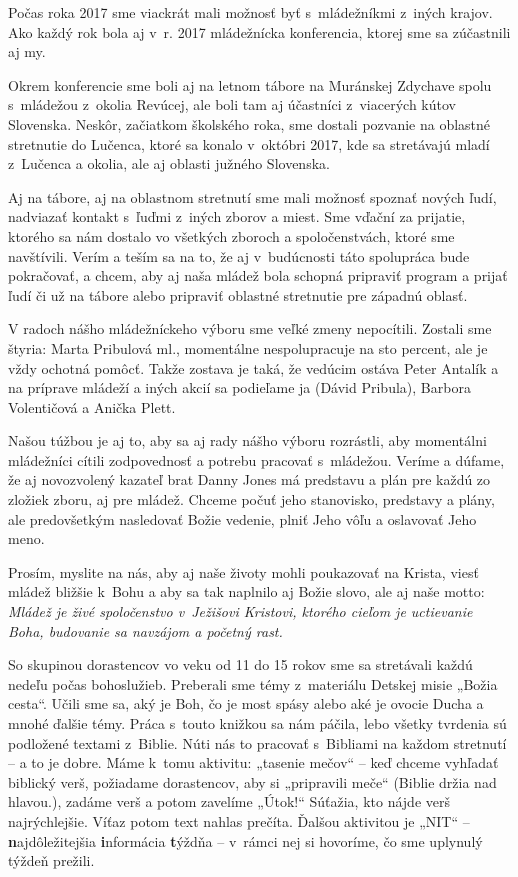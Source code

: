 Počas roka 2017 sme viackrát mali možnosť byť s~mládežníkmi z~iných krajov. Ako každý rok bola aj v~r. 2017 mládežnícka konferencia, ktorej sme sa zúčastnili aj my.

Okrem konferencie sme boli aj na letnom tábore na Muránskej Zdychave spolu s~mládežou z~okolia Revúcej, ale boli tam aj účastníci z~viacerých kútov Slovenska.
Neskôr, začiatkom školského roka, sme dostali pozvanie na oblastné stretnutie do Lučenca, ktoré sa konalo v~októbri 2017, kde sa stretávajú mladí z~Lučenca a okolia, ale aj oblasti južného Slovenska.

Aj na tábore, aj na oblastnom stretnutí sme mali možnosť spoznať nových ľudí, nadviazať kontakt s~ľuďmi z~iných zborov a miest. Sme vďační za prijatie, ktorého sa nám dostalo vo všetkých zboroch a spoločenstvách, ktoré sme navštívili. Verím a teším sa na to, že aj v~budúcnosti táto spolupráca bude pokračovať, a chcem, aby aj naša mládež bola schopná pripraviť program a prijať ľudí či už na tábore alebo pripraviť oblastné stretnutie pre západnú oblasť.

V radoch nášho mládežníckeho výboru sme veľké zmeny nepocítili. Zostali sme štyria: Marta Pribulová ml., momentálne nespolupracuje na sto percent, ale je vždy ochotná pomôcť. Takže zostava je taká, že vedúcim ostáva Peter Antalík a na príprave mládeží a iných akcií sa podieľame ja (Dávid Pribula), Barbora Volentičová a Anička Plett.

Našou túžbou je aj to, aby sa aj rady nášho výboru rozrástli, aby momentálni mládežníci cítili zodpovednosť a potrebu pracovať s~mládežou. Veríme a dúfame, že aj novozvolený kazateľ brat Danny Jones má predstavu a plán pre každú zo zložiek zboru, aj pre mládež. Chceme počuť jeho stanovisko, predstavy a plány, ale predovšetkým nasledovať Božie vedenie, plniť Jeho vôľu a oslavovať Jeho meno.

Prosím, myslite na nás, aby aj naše životy mohli poukazovať na Krista, viesť mládež bližšie k~Bohu a aby sa tak naplnilo aj Božie slovo, ale aj naše motto:  {\it Mládež je živé spoločenstvo v~Ježišovi Kristovi, ktorého cieľom je uctievanie Boha, budovanie sa navzájom a početný rast.}



So skupinou dorastencov vo veku od 11 do 15 rokov sme sa stretávali každú nedeľu počas bohoslužieb. Preberali sme témy z~materiálu Detskej misie „Božia cesta“. Učili sme sa, aký je Boh, čo je most spásy alebo aké je ovocie Ducha a mnohé ďalšie témy. Práca s~touto knižkou sa nám páčila, lebo všetky tvrdenia sú podložené textami z~Biblie. Núti nás to pracovať s~Bibliami na každom stretnutí -- a to je dobre. Máme k~tomu aktivitu: „tasenie mečov“ -- keď chceme vyhľadať biblický verš, požiadame dorastencov, aby si „pripravili meče“ (Biblie držia nad hlavou.), zadáme verš a potom zavelíme „Útok!“ Súťažia, kto nájde verš najrýchlejšie. Víťaz potom  text nahlas prečíta. Ďalšou aktivitou je „NIT“ -- {\bf n}ajdôležitejšia {\bf i}nformácia {\bf t}ýždňa -- v~rámci nej si hovoríme, čo sme uplynulý týždeň prežili.


